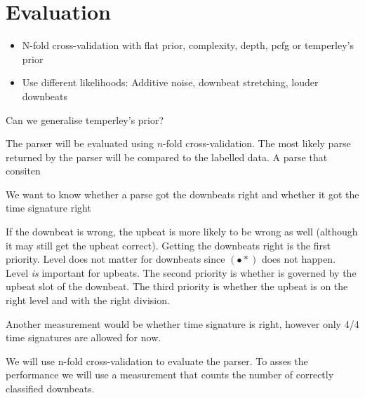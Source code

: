\section{Evaluation}
\label{sec:evaluation}

\begin{itemize}
\item N-fold cross-validation with flat prior, complexity, depth, pcfg or temperley's prior
\item Use different likelihoods: Additive noise, downbeat stretching, louder downbeats
\end{itemize}

Can we generalise temperley's prior?


The parser will be evaluated using $n$-fold cross-validation. The most likely parse returned by the parser will be compared to the labelled data. A parse that consiten

We want to know whether a parse got the downbeats right and whether it got the time signature right

If the downbeat is wrong, the upbeat is more likely to be wrong as well (although it may still get the upbeat correct). Getting the downbeats right is the first priority. Level does not matter for downbeats since $(\bullet *)$ does not happen. Level \textit{is} important for upbeats. The second priority is whether is governed by the upbeat slot of the downbeat. The third priority is whether the upbeat is on the right level and with the right division.

Another measurement would be whether time signature is right, however only 4/4 time signatures are allowed for now.


We will use n-fold cross-validation to evaluate the parser. To asses the performance we will use a measurement that counts the number of correctly classified downbeats. 

